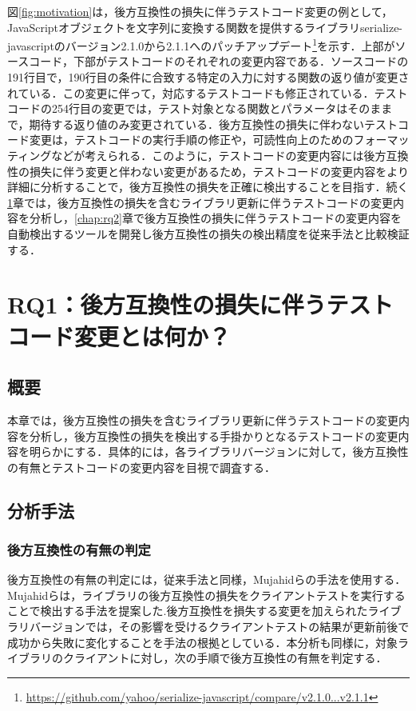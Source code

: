\documentclass[11pt,dvipdfmx]{jreport}
\begin{document}
図\ref{fig:motivation}は，後方互換性の損失に伴うテストコード変更の例として，JavaScriptオブジェクトを文字列に変換する関数を提供するライブラリserialize-javascriptのバージョン2.1.0から2.1.1へのパッチアップデート\footnote{\url{https://github.com/yahoo/serialize-javascript/compare/v2.1.0...v2.1.1}}を示す．上部がソースコード，下部がテストコードのそれぞれの変更内容である．ソースコードの191行目で，190行目の条件に合致する特定の入力に対する関数の返り値が変更されている．この変更に伴って，対応するテストコードも修正されている．テストコードの254行目の変更では，テスト対象となる関数とパラメータはそのままで，期待する返り値のみ変更されている．後方互換性の損失に伴わないテストコード変更は，テストコードの実行手順の修正や，可読性向上のためのフォーマッティングなどが考えられる．このように，テストコードの変更内容には後方互換性の損失に伴う変更と伴わない変更があるため，テストコードの変更内容をより詳細に分析することで，後方互換性の損失を正確に検出することを目指す．続く\ref{chap:rq1}章では，後方互換性の損失を含むライブラリ更新に伴うテストコードの変更内容を分析し，\ref{chap:rq2}章で後方互換性の損失に伴うテストコードの変更内容を自動検出するツールを開発し後方互換性の損失の検出精度を従来手法と比較検証する．

\chapter{RQ1：後方互換性の損失に伴うテストコード変更とは何か？}\label{chap:rq1}

\section{概要}
本章では，後方互換性の損失を含むライブラリ更新に伴うテストコードの変更内容を分析し，後方互換性の損失を検出する手掛かりとなるテストコードの変更内容を明らかにする．具体的には，各ライブラリバージョンに対して，後方互換性の有無とテストコードの変更内容を目視で調査する．

\section{分析手法}

\subsection{後方互換性の有無の判定}\label{subsec:kouhougokanseinohantei}
後方互換性の有無の判定には，従来手法と同様，Mujahidらの手法を使用する．Mujahidらは，ライブラリの後方互換性の損失をクライアントテストを実行することで検出する手法を提案した\cite{mujahid}.後方互換性を損失する変更を加えられたライブラリバージョンでは，その影響を受けるクライアントテストの結果が更新前後で成功から失敗に変化することを手法の根拠としている．本分析も同様に，対象ライブラリのクライアントに対し，次の手順で後方互換性の有無を判定する．
\end{document}
